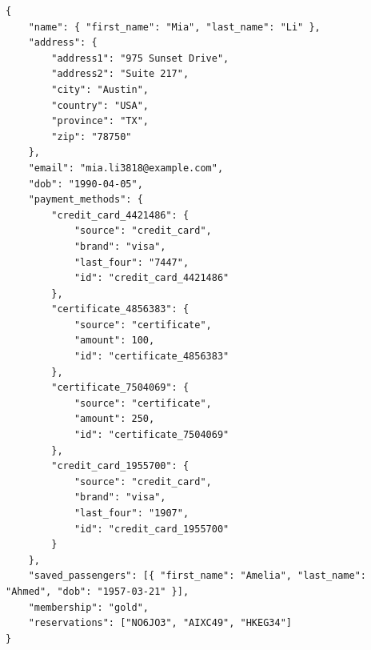 \begin{listing}[ht]
\begin{verbatim}
{
    "name": { "first_name": "Mia", "last_name": "Li" },
    "address": {
        "address1": "975 Sunset Drive",
        "address2": "Suite 217",
        "city": "Austin",
        "country": "USA",
        "province": "TX",
        "zip": "78750"
    },
    "email": "mia.li3818@example.com",
    "dob": "1990-04-05",
    "payment_methods": {
        "credit_card_4421486": {
            "source": "credit_card",
            "brand": "visa",
            "last_four": "7447",
            "id": "credit_card_4421486"
        },
        "certificate_4856383": {
            "source": "certificate",
            "amount": 100,
            "id": "certificate_4856383"
        },
        "certificate_7504069": {
            "source": "certificate",
            "amount": 250,
            "id": "certificate_7504069"
        },
        "credit_card_1955700": {
            "source": "credit_card",
            "brand": "visa",
            "last_four": "1907",
            "id": "credit_card_1955700"
        }
    },
    "saved_passengers": [{ "first_name": "Amelia", "last_name": "Ahmed", "dob": "1957-03-21" }],
    "membership": "gold",
    "reservations": ["NO6JO3", "AIXC49", "HKEG34"]
}
\end{verbatim}
\caption{An example entry from the users database in \airline{}.}
\end{listing}

